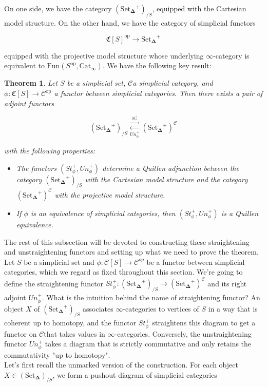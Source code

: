 \documentclass[12pt]{amsart}
\newcommand{\8}{\ensuremath{\infty}}
\newcommand{\C}{\ensuremath{\mathscr{C}}}
\newcommand{\SSet}{\ensuremath{\text{Set}_{\boldsymbol{\Delta}}}}
\newcommand{\op}[1]{\ensuremath{{#1}^{\text{op}}}}
\newcommand{\adj}[2]{\ensuremath{\overset{\overset{#1}{ \rightarrow}}{\underset{#2}{\leftarrow}}}}
\newtheorem{theorem}{Theorem}
\begin{document}
On one side, we have the category $(\SSet^+)_{/S}$, equipped with the Cartesian model structure. On the other hand, we have the category of simplicial functors

$$
  \op{\mathfrak{C}[S]} \rightarrow \SSet^+
$$

equipped with the projective model structure whose underlying \8-category is equivalent to $\text{Fun}(\op{S}, \text{Cat}_\8). $ We have the following key result:

\begin{theorem}
  Let $S$ be a simplicial set, \C a simplicial category, and $\phi: \mathfrak{C}[S] \rightarrow \op\C$ a functor between simplicial categories. Then there exists a pair of adjoint functors

  $$
    (\SSet^+)_{/S} \adj{St_\phi^+}{Un_\phi^+} (\SSet^+)^\C
  $$

  with the following properties:

  \begin{itemize}
    \item[(1)] The functors $(St_\phi^+, Un_\phi^+)$ determine a Quillen adjunction between the category $(\SSet^+)_{/S}$ with the Cartesian model structure and the category $(\SSet^+)^\C$ with the projective model structure.
    \item[(2)] If $\phi$ is an equivalence of simplicial categories, then $(St_\phi^+, Un_\phi^+)$ is a Quillen equivalence.
  \end{itemize}
\end{theorem}

The rest of this subsection will be devoted to constructing these straightening and unstraightening functors and setting up what we need to prove the theorem.\\
Let $S$ be a simplicial set and $\phi:\mathscr{C}[S]\rightarrow \mathcal{C}^{op}$ be a functor between simplicial categories, which we regard as fixed throughout this section. We're going to define the straightening functor $St_\phi^+:(\SSet^+)_{/S}\rightarrow (\SSet^+)^\C$ and its right adjoint $Un_\phi^+$. What is the intuition behind the name of straightening functor? An object $X$ of $(\SSet^+)_{/S}$ associates \8-categories to vertices of $S$ in a way that is coherent up to homotopy, and the functor $St_\phi^+$ straightens this diagram to get a functor on \C that takes values in \8-categories. Conversely, the unstraightening functor $Un_\phi^+$ takes a diagram that is strictly commutative and only retains the commutativity "up to homotopy".\\
Let's first recall the unmarked version of the construction. For each object $X\in(\SSet)_{/S}$, we form a pushout diagram of simplicial categories
\end{document}
